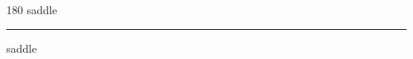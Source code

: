 
\begin{frame}
\begin{center}
\begin{turn}{180}
{\fontsize{2.5cm}{1em}\selectfont saddle}
\end{turn}
\vspace{1em}\par  
\hrule
\vspace{1em}\par  
{\fontsize{2.5cm}{1em}\selectfont saddle}
\end{center}
\end{frame}
